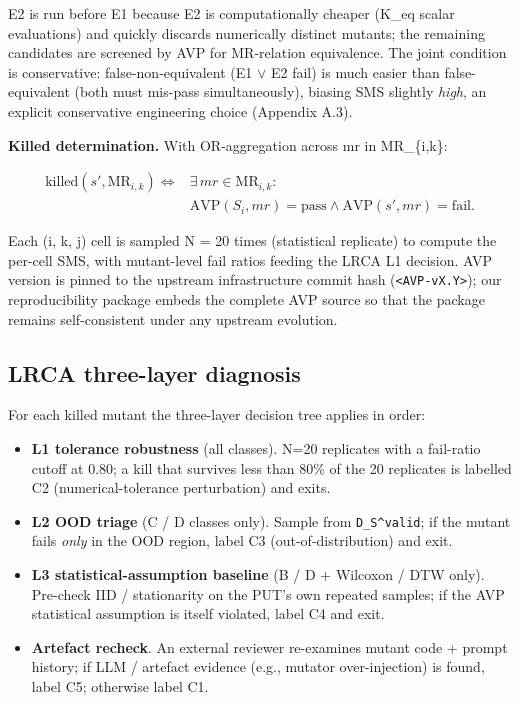 \documentclass[acmsmall,screen,review]{acmart}
\providecommand{\tightlist}{\setlength{\itemsep}{0pt}\setlength{\parskip}{0pt}}
\begin{document}
E2 is run before E1 because E2 is computationally cheaper (K\_eq scalar
evaluations) and quickly discards numerically distinct mutants; the
remaining candidates are screened by AVP for MR-relation equivalence.
The joint condition is conservative: false-non-equivalent (E1 $\vee$ E2 fail)
is much easier than false-equivalent (both must mis-pass
simultaneously), biasing SMS slightly \emph{high}, an explicit
conservative engineering choice (Appendix A.3).

\textbf{Killed determination.} With OR-aggregation across mr in
MR\_\{i,k\}:

\[
\begin{aligned}
\mathrm{killed}(s', \mathrm{MR}_{i,k}) \iff{} & \exists\,mr \in \mathrm{MR}_{i,k}: \\
& \mathrm{AVP}(S_i, mr) = \text{pass} \wedge
  \mathrm{AVP}(s', mr) = \text{fail}.
\end{aligned}
\]

Each (i, k, j) cell is sampled N = 20 times (statistical replicate) to
compute the per-cell SMS, with mutant-level fail ratios feeding the LRCA
L1 decision. AVP version is pinned to the upstream infrastructure commit hash
(\texttt{\textless{}AVP-vX.Y\textgreater{}}); our reproducibility
package embeds the complete AVP source so that the package remains
self-consistent under any upstream evolution.

\subsection{LRCA three-layer diagnosis}\label{lrca-three-layer-diagnosis}

For each killed mutant the three-layer decision tree applies in order:

\begin{itemize}
\tightlist
\item
  \textbf{L1 tolerance robustness} (all classes). N=20 replicates with a
  fail-ratio cutoff at 0.80; a kill that survives less than 80\% of the
  20 replicates is labelled C2 (numerical-tolerance perturbation) and
  exits.
\item
  \textbf{L2 OOD triage} (C / D classes only). Sample from
  \texttt{D\_S\^{}valid}; if the mutant fails \emph{only} in the OOD
  region, label C3 (out-of-distribution) and exit.
\item
  \textbf{L3 statistical-assumption baseline} (B / D + Wilcoxon / DTW
  only). Pre-check IID / stationarity on the PUT's own repeated samples;
  if the AVP statistical assumption is itself violated, label C4 and
  exit.
\item
  \textbf{Artefact recheck}. An external reviewer re-examines mutant
  code + prompt history; if LLM / artefact evidence (e.g., mutator
  over-injection) is found, label C5; otherwise label C1.
\end{itemize}
\end{document}
